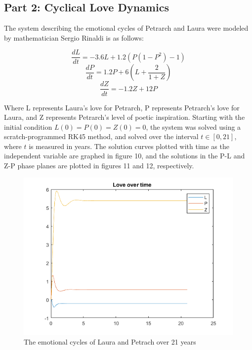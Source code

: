 \documentclass[11pt]{article}
\begin{document}
\subsection{Part 2: Cyclical Love Dynamics}
%
The system describing the emotional cycles of Petrarch and Laura were modeled by
mathematician Sergio Rinaldi is as follows:

$$\frac{dL}{dt}=-3.6L+1.2(P(1-P^{2})-1)$$
$$\frac{dP}{dt}=1.2P+6(L+\frac{2}{1+Z})$$
$$\frac{dZ}{dt}=-1.2Z+12P$$

Where L represents Laura's love for Petrarch, P represents Petrarch's love for
Laura, and Z represents Petrarch's level of poetic inspiration. Starting with the 
initial condition $L(0)=P(0)=Z(0)=0$, the system was solved using a scratch-programmed
RK45 method, and solved
over the interval
$t\in [0,21]$, where $t$ is measured in years. The solution curves plotted with time 
as the independent variable are graphed in figure 10, and the solutions in the
P-L and Z-P phase planes are plotted in figures 11 and 12, respectively. 

\begin{figure} [h]
\centering
        \includegraphics[totalheight=10cm]{love1.png}
    \caption{The emotional cycles of Laura and Petrach over 21 years}
    \label{figure5}
\end{figure}
\end{document}
